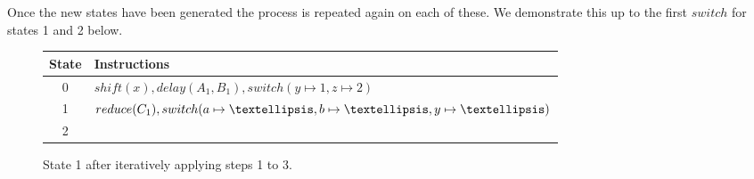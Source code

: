 \documentclass[a4paper,11pt]{article}
\begin{document}
\clearpage
Once the new states have been generated the process is repeated again on each of these. We demonstrate this up to the first $switch$ for states 1 and 2 below.

\begin{figure}[!ht]
\centering
{}

\vspace{.5\baselineskip}
\small{\begin{tabular}{|c|l|}
  \hline
  \textbf{State} & \textbf{Instructions} \\
  \hline
  0 & $shift(x), delay(A_1, B_1), switch(y \mapsto 1, z \mapsto 2)$ \\
  1 & $reduce(C_1), switch(a \mapsto \textellipsis, b \mapsto \textellipsis, y \mapsto \textellipsis)$ \\ 
  2 & $ $ \\  
  \hline
\end{tabular}}
\caption{State 1 after iteratively applying steps 1 to 3.}
\end{figure}
\end{document}
